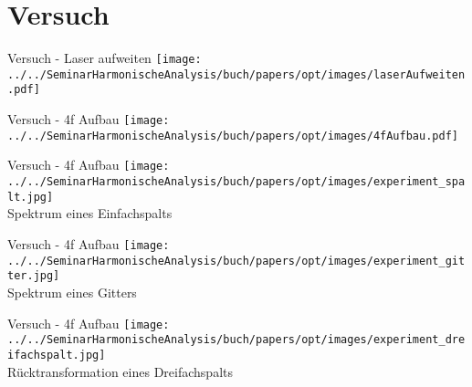\section{Versuch}

\begin{frame}{Versuch - Laser aufweiten}
    \centering
    \texttt{[image: ../../SeminarHarmonischeAnalysis/buch/papers/opt/images/laserAufweiten.pdf]}
\end{frame}

\begin{frame}{Versuch - 4f Aufbau}
    \texttt{[image: ../../SeminarHarmonischeAnalysis/buch/papers/opt/images/4fAufbau.pdf]}
\end{frame}

\begin{frame}{Versuch - 4f Aufbau}
    \centering
    \texttt{[image: ../../SeminarHarmonischeAnalysis/buch/papers/opt/images/experiment\_spalt.jpg]} \\
    Spektrum eines Einfachspalts
\end{frame}

\begin{frame}{Versuch - 4f Aufbau}
    \centering
    \texttt{[image: ../../SeminarHarmonischeAnalysis/buch/papers/opt/images/experiment\_gitter.jpg]} \\
    Spektrum eines Gitters
\end{frame}

\begin{frame}{Versuch - 4f Aufbau}
    \centering
    \texttt{[image: ../../SeminarHarmonischeAnalysis/buch/papers/opt/images/experiment\_dreifachspalt.jpg]} \\
    Rücktransformation eines Dreifachspalts
\end{frame}
